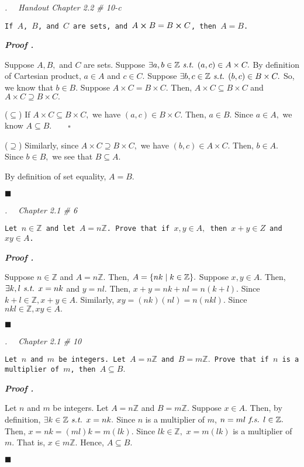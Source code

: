 \documentclass[11pt,letter]{article}
\newcounter{nq}[section]
\newcounter{np}[section]
\newenvironment*{p}{\par\noindent\textbf{\textit{Proof \stepcounter{np}\thenp. }}\par}{\par\hfill $\blacksquare$\par}
\newenvironment*{q}[1]{\noindent\emph{\thesection.\stepcounter{nq}\thenq$\quad $ #1}\par\noindent\texttt}{}
\def\Z{{\mathbb{Z}}}
\def\st{\emph{ s.t. }}
\def\fs{\emph{ f.s. }}
\begin{document}
\begin{framed}\begin{q}
	{Handout Chapter 2.2 \# 10-c}
	{If $A$, $B$, and $C$ are sets, and $A\cross B=B\cross C$, then $A=B$.}
\end{q}\end{framed}
\begin{p}
	Suppose $A,B,$ and $C$ are sets. Suppose $\exists a,b\in\Z\st(a,c)\in A\times C.$ By definition of Cartesian product, $a\in A$ and $c\in C.$ Suppose $\exists b,c\in\Z\st(b,c)\in B\times C.$ So, we know that $b\in B.$ Suppose $A\times C=B\times C.$ Then, $A\times C\subseteq B\times C$ and $A\times C\supseteq B\times C.$\par 
	($\subseteq$) If $A\times C\subseteq B\times C,$ we have $(a,c)\in B\times C.$ Then, $a\in B.$ Since $a\in A,$ we know $A\subseteq B.\qquad\square$\par 
	($\supseteq$) Similarly, since $A\times C\supseteq B\times C,$ we have $(b,c)\in A\times C.$ Then, $b\in A.$ Since $b\in B,$ we see that $B\subseteq A.$\par 
	By definition of set equality, $A=B.$
\end{p}

\begin{framed}\begin{q}
	{Chapter 2.1 \# 6}
	{Let $n\in\Z$ and let $A=n\Z$. Prove that if $x,y\in A,$ then $x+y\in Z$ and $xy\in A$.}
\end{q}\end{framed}
\begin{p}
	Suppose $n\in\Z$ and $A=n\Z.$ Then, $A=\qty{nk\mid k\in\Z}.$ Suppose $x,y\in A.$ Then, $\exists k,l\st x=nk$ and $y=nl.$ Then, $x+y=nk+nl=n(k+l).$ Since $k+l\in\Z, x+y\in A.$ Similarly, $xy=(nk)(nl)=n(nkl).$ Since $nkl\in\Z,xy\in A.$
\end{p}

\begin{framed}\begin{q}
	{Chapter 2.1 \# 10}
	{Let $n$ and $m$ be integers. Let $A=n\Z$ and $B=m\Z.$ Prove that if $n$ is a multiplier of $m$, then $A\subseteq B.$}
\end{q}\end{framed}
\begin{p}
	Let $n$ and $m$ be integers. Let $A=n\Z$ and $B=m\Z.$ Suppose $x\in A$. Then, by definition, $\exists k\in\Z\st x=nk.$ Since $n$ is a multiplier of $m$, $n=ml\fs l\in\Z.$ Then, $x=nk=(ml)k=m(lk).$ Since $lk\in\Z,$ $x=m(lk)$ is a multiplier of $m$. That is, $x\in m\Z.$ Hence, $A\subseteq B.$
\end{p}
\end{document}
